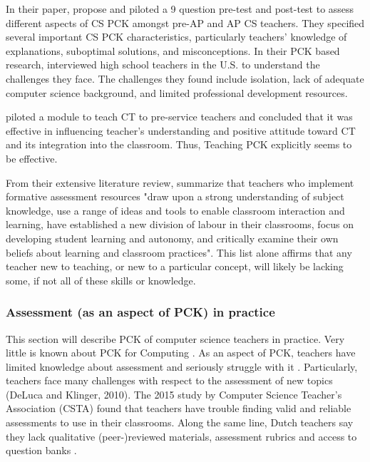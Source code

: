 In their paper,  propose and piloted a 9 question pre-test and post-test to assess different aspects of CS PCK amongst pre-AP and AP CS teachers. They specified several important CS PCK characteristics, particularly teachers' knowledge of explanations, suboptimal solutions, and misconceptions.  In their PCK based research,  interviewed high school teachers in the U.S. to understand the challenges they face. The challenges they found include isolation, lack of adequate computer science background, and limited professional development resources.

 piloted a module to teach CT to pre-service teachers and concluded that it was effective in influencing teacher's understanding and positive attitude toward CT and its integration into the classroom. Thus, Teaching PCK explicitly seems to be effective.








From their extensive literature review, \citeauthor{hermansen2014reworking} summarize that teachers who implement formative assessment resources "draw upon a strong understanding of subject knowledge, use a range of ideas and tools to enable classroom interaction and learning, have established a new division of labour in their classrooms, focus on developing student learning and autonomy, and critically examine their own beliefs about learning and classroom practices". This list alone affirms that any teacher new to teaching, or new to a particular concept, will likely be lacking some, if not all of these skills or knowledge.



\subsubsection*{Assessment (as an aspect of PCK) in practice}

This section will describe PCK of computer science teachers in practice. Very little is known about PCK for Computing \cite{Yadav2016}. As an aspect of PCK, teachers have limited knowledge about assessment and seriously struggle with it \cite{popham2009assessment}. Particularly, teachers face many challenges with respect to the assessment of new topics (DeLuca and Klinger, 2010). The 2015 study by Computer Science Teacher's Association (CSTA) found that teachers have trouble finding valid and reliable assessments to use in their classrooms. Along the same line, Dutch teachers say they lack qualitative (peer-)reviewed materials, assessment rubrics and access to question banks \cite{tolboom2014informatica}.


